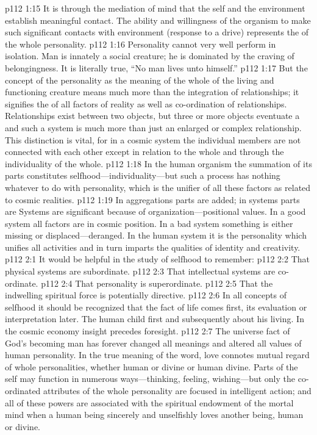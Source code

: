 \vs p112 1:15 It is through the mediation of mind that the self and the environment establish meaningful contact. The ability and willingness of the organism to make such significant contacts with environment (response to a drive) represents the  of the whole personality.
\vs p112 1:16 Personality cannot very well perform in isolation. Man is innately a social creature; he is dominated by the craving of belongingness. It is literally true, “No man lives unto himself.”
\vs p112 1:17 But the concept of the personality as the meaning of the whole of the living and functioning creature means much more than the integration of relationships; it signifies the  of all factors of reality as well as co\hyp{}ordination of relationships. Relationships exist between two objects, but three or more objects eventuate a  and such a system is much more than just an enlarged or complex relationship. This distinction is vital, for in a cosmic system the individual members are not connected with each other except in relation to the whole and through the individuality of the whole.
\vs p112 1:18 In the human organism the summation of its parts constitutes selfhood---individuality---but such a process has nothing whatever to do with personality, which is the unifier of all these factors as related to cosmic realities.
\vs p112 1:19 In aggregations parts are added; in systems parts are  Systems are significant because of organization---positional values. In a good system all factors are in cosmic position. In a bad system something is either missing or displaced---deranged. In the human system it is the personality which unifies all activities and in turn imparts the qualities of identity and creativity.
\vs p112 2:1 It would be helpful in the study of selfhood to remember:
\pc \vs p112 2:2 \bibnobreakspace That physical systems are subordinate.
\vs p112 2:3 \bibnobreakspace That intellectual systems are co\hyp{}ordinate.
\vs p112 2:4 \bibnobreakspace That personality is superordinate.
\vs p112 2:5 \bibnobreakspace That the indwelling spiritual force is potentially directive.
\pc \vs p112 2:6 In all concepts of selfhood it should be recognized that the fact of life comes first, its evaluation or interpretation later. The human child first  and subsequently  about his living. In the cosmic economy insight precedes foresight.
\pc \vs p112 2:7 The universe fact of God’s becoming man has forever changed all meanings and altered all values of human personality. In the true meaning of the word, love connotes mutual regard of whole personalities, whether human or divine or human  divine. Parts of the self may function in numerous ways---thinking, feeling, wishing---but only the co\hyp{}ordinated attributes of the whole personality are focused in intelligent action; and all of these powers are associated with the spiritual endowment of the mortal mind when a human being sincerely and unselfishly loves another being, human or divine.

